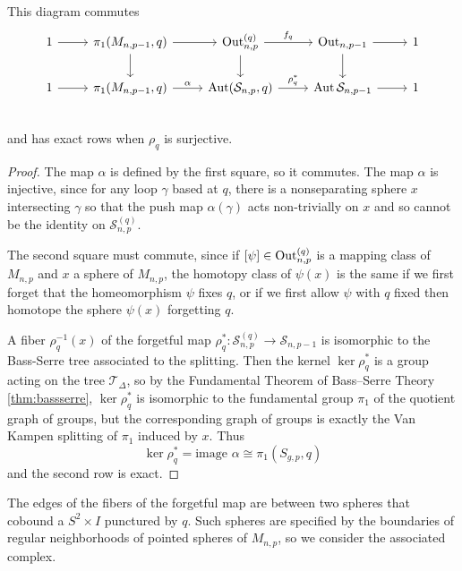 \begin{lemma}
  This diagram commutes
  $$
  \begin{tikzcd}
  1 \arrow[r]&
  \pi_1(M_{n,p-1},q) \arrow[r] \arrow[d]&
  \oout_{n,p}^{(q)}  \arrow{r}{f_q} \arrow[d]&
  \oout_{n,p-1} \arrow[r] \arrow[d]&
  1 \\
  1 \arrow[r]&
  \pi_1(M_{n,p-1},q) \arrow{r}{\alpha}&
  \aaut (\mathcal S_{n,p}, q)  \arrow{r}{\rho^\ast_{q}}&
  \aaut \mathcal S_{n,p-1} \arrow{r}&
  1 \\
  \end{tikzcd}
  $$
  and has exact rows when $\rho_{q}$ is surjective.
  \label{lemma:exactspheres}
\end{lemma}

\begin{proof}
  The map $\alpha$ is defined by the first square, so it commutes.
  The map $\alpha$ is injective, since
  for any loop $\gamma$ based at $q$,
  there is a nonseparating sphere $x$ intersecting $\gamma$
  so that the push map $\alpha(\gamma)$ acts non-trivially on $x$ and so cannot be the identity on $\mathcal S_{n,p}^{(q)}$.

  The second square must commute,
  since if $[\psi] \in \operatorname{Out}_{n,p}^{(q)}$
  is a mapping class of $M_{n,p}$ and $x$ a sphere of $M_{n,p}$,
  the homotopy class of $\psi(x)$ is the same if we first
  forget that the homeomorphism $\psi$ fixes $q$, or if we first allow $\psi$ with
  $q$ fixed then homotope the sphere $\psi(x)$ forgetting $q$.

  A fiber $\rho^{-1}_q(x)$ of the forgetful map
  $\rho^\ast_q: \mathcal  S_{n,p}^{(q)} \to \mathcal  S_{n,p-1}$
  is isomorphic to the Bass-Serre tree associated to the splitting.
  Then the kernel $\ker \rho^\ast_{q}$ is a
  group acting on the tree $\mathcal T_\Delta$,
  so by the
  Fundamental Theorem of Bass–Serre Theory
  \ref{thm:bassserre},
  $\ker \rho^\ast_{q}$ is isomorphic to
  the fundamental group $\pi_1$ of the
  quotient graph of groups,
  but the corresponding graph of groups is
  exactly the Van Kampen splitting of $\pi_1$ induced by $x$.
  Thus
  $$\ker \rho^\ast_{q} = \mbox{image } \alpha \cong \pi_1(S_{g,p},q)$$
  and the second row is exact.
\end{proof}

\begin{remark}
  The edges of the fibers of the forgetful map
  are between two spheres that cobound a
  $S^2 \times I$
  punctured by $q$.
  Such spheres are specified by the boundaries of regular neighborhoods of pointed spheres of $M_{n,p}$,
  so we consider the associated complex.
\end{remark}

